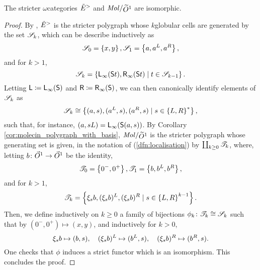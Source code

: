\begin{lem} \label{lem:swE_is_iso_to_molecin_loc_globe}
    The stricter \( \omega \)\nbd categories \( \tilde E^> \) and \( \molecin{\rglobe{1}} \) are isomorphic.
\end{lem}
\begin{proof}
    By \cite[Remark 1.29]{hadzihasanovic2024model}, \( \tilde E^> \) is the stricter polygraph whose \( k \)\nbd globular cells are
    generated by the set \( \mathscr{S}_k \), which can be describe inductively as
    \begin{equation*}
        \mathscr{S}_0 = \left\{ {x, y} \right\}, \mathscr{S}_1 = \left\{ {a, a^L, a^R} \right\},
    \end{equation*} 
    and for \( k > 1 \),
    \begin{equation*}
        \mathscr{S}_k = \left\{ {\mathsf{L}_\infty(\mathsf{S}{t}), \mathsf{R}_\infty(\mathsf{S}{t}) \mid t \in \mathscr{S}_{k - 1}} \right\}.
    \end{equation*}
    Letting \( \mathsf{L} \coloneqq \mathsf{L}_\infty(\mathsf{S}{}) \) and \( \mathsf{R} \coloneqq \mathsf{R}_\infty(\mathsf{S}{}) \), we can then canonically identify elements of \( \mathscr{S}_k \)
    as 
    \begin{equation*}
        \mathscr{S}_k \cong \left\{ {(a, s), (a^L, s), (a^R, s) \mid s \in \left\{ {L, R} \right\}^*} \right\},
    \end{equation*}
    such that, for instance, \( (a, sL) = \mathsf{L}_\infty(\mathsf{S}{(a, s)}) \).
    By Corollary \ref{cor:molecin_polygraph_with_basis}, \( \molecin{\rglobe{1}} \) is the stricter polygraph whose generating set is given, in the notation of (\ref{dfn:localisation}) by \( \coprod_{k \geq 0} \mathscr{T}_k \), where, letting \( b \colon \vec{O}^{1} \to \vec{O}^{1} \) be the identity, 
    \begin{equation*}
        \mathscr{T}_0 = \left\{ {0^-, 0^+} \right\}, \mathscr{T}_1 = \left\{ {b, b^L, b^R} \right\},
    \end{equation*}
    and for \( k > 1 \),
    \begin{equation*}
        \mathscr{T}_k = \left\{ {\xi_{s}b, (\xi_{s}b)^L, (\xi_{s}b)^R \mid s \in \left\{ {L, R} \right\}^{k - 1}} \right\}.
    \end{equation*}
    Then, we define inductively on \( k \geq 0 \) a family of bijections \( \phi_k \colon \mathscr{T}_k \cong \mathscr{S}_k \) such that by \( (0^-, 0^+) \mapsto (x, y) \), and inductively for \( k > 0 \),
    \begin{equation*}
        \xi_{s}b \mapsto (b, s),\quad (\xi_{s}b)^L \mapsto (b^L, s),\quad (\xi_{s}b)^R \mapsto (b^R, s).
    \end{equation*}
    One checks that \( \phi \) induces a strict functor which is an isomorphism.
    This concludes the proof.
\end{proof}

